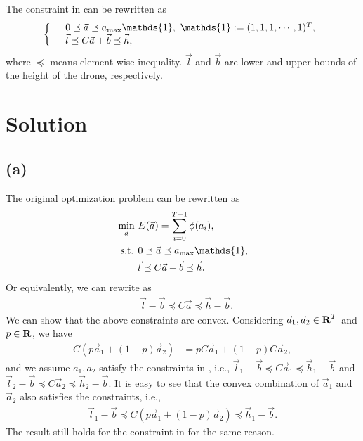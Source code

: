 \documentclass[letterpaper,11pt]{article}
\begin{document}
The constraint in  can be rewritten as
\begin{align}
    \label{eq:linear-map-constraint}
    \left\{
    \begin{array}{ll}
        & 0\preceq \vec a \preceq a_{\rm max}\mathds{1},~\mathds{1}:=(1,1,1,\cdots,1)^T,\\
        & \vec l\preceq C \vec a + \vec b \preceq \vec h,
    \end{array}\right.
\end{align}
where $\preceq$ means element-wise inequality. $\vec l$ and $\vec h$ are lower and upper bounds of the height of the drone, respectively.

\section{Solution}

\subsection*{(a)}

The original optimization problem can be rewritten as
\begin{align}
    \min_{\vec a}~ &E(\vec a) = \sum_{i=0}^{T-1} \phi(a_i),\\
    \label{eq:acc-constraint}
    \text{ s.t. } &0\preceq \vec a \preceq a_{\rm max}\mathds{1},\\
    \label{eq:height-constraint}
    &\vec l\preceq C \vec a + \vec b \preceq \vec h.
\end{align}
Or equivalently, we can rewrite  as
\begin{align}
    \label{eq:height-constraint2}
    &\vec l - \vec b \preceq C \vec a \preceq \vec h - \vec b.
\end{align}
We can show that the above constraints are convex.
Considering $\vec a_1, \vec a_2\in \operatorname{\mathbf{R}}^T$ and $p\in \operatorname{\mathbf{R}}$, we have
\begin{align}
    C (p \vec a_1 + (1-p) \vec a_2) &= p C \vec a_1 + (1-p) C \vec a_2,
\end{align}
and we assume $a_1,a_2$ satisfy the constraints in , i.e., $\vec l_1 - \vec b \preceq C \vec a_1 \preceq \vec h_1 - \vec b$ and $\vec l_2 - \vec b \preceq C \vec a_2 \preceq \vec h_2 - \vec b$.
It is easy to see that the convex combination of $\vec a_1$ and $\vec a_2$ also satisfies the constraints, i.e.,
\begin{align}
    \vec l_1 - \vec b \preceq C (p \vec a_1 + (1-p) \vec a_2) \preceq \vec h_1 - \vec b.
\end{align}
The result still holds for the constraint in  for the same reason.
\end{document}
